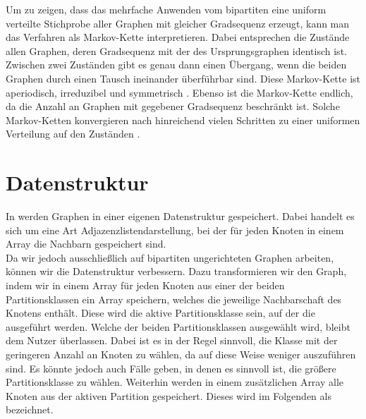 Um zu zeigen, dass das mehrfache Anwenden vom bipartiten \gc{} eine uniform verteilte
Stichprobe aller Graphen mit gleicher Gradsequenz erzeugt, kann man das Verfahren als Markov-Kette interpretieren.
Dabei entsprechen die Zustände allen Graphen, deren Gradsequenz mit der des Ursprungsgraphen identisch
ist.
Zwischen zwei Zuständen gibt es genau dann einen Übergang, wenn die beiden Graphen durch einen
\gc{} Tausch ineinander überführbar sind. Diese Markov-Kette 
ist aperiodisch, irreduzibel und symmetrisch \cite{penschuck2020recent}.
 Ebenso ist die Markov-Kette endlich, da die Anzahl an
Graphen mit gegebener Gradsequenz beschränkt ist. 
Solche Markov-Ketten konvergieren nach hinreichend vielen Schritten zu 
einer uniformen Verteilung auf den Zuständen \cite{markov_converge}.






\section{Datenstruktur}
\label{sec:datenstruktur}
In \nk{} werden Graphen in einer eigenen Datenstruktur gespeichert.
Dabei handelt es sich um eine Art Adjazenzlistendarstellung, bei der für jeden Knoten 
in einem Array die Nachbarn gespeichert sind. 
\\

Da wir jedoch ausschließlich auf bipartiten ungerichteten Graphen
arbeiten, können wir die Datenstruktur verbessern. 
Dazu transformieren wir
den Graph, indem wir in einem Array für jeden Knoten aus einer der beiden Partitionsklassen
ein Array speichern, welches die jeweilige Nachbarschaft des Knotens enthält.
Diese
wird die aktive Partitionsklasse sein, auf der die  ausgeführt werden.
Welche der beiden Partitionsklassen ausgewählt wird, bleibt dem Nutzer überlassen. 
Dabei ist es in der Regel sinnvoll, die Klasse mit der geringeren Anzahl an Knoten zu wählen, da auf diese
Weise weniger  auszuführen sind. Es könnte jedoch auch Fälle geben, in denen es 
sinnvoll ist, die größere Partitionsklasse zu wählen.
Weiterhin werden in einem zusätzlichen Array alle Knoten aus der aktiven Partition gespeichert.
Dieses wird im Folgenden als \partvek{} bezeichnet. 
\\

